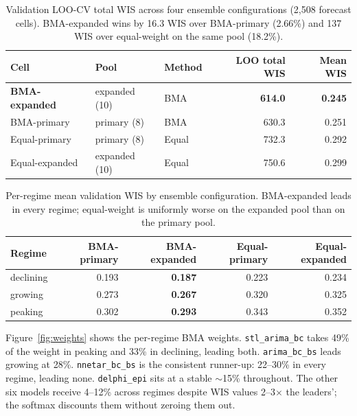 \documentclass[11pt]{article}
\begin{document}
\begin{table}[h]
\centering
\caption{Validation LOO-CV total WIS across four ensemble configurations
(2,508 forecast cells). BMA-expanded wins by 16.3 WIS over BMA-primary
(2.66\%) and 137 WIS over equal-weight on the same pool (18.2\%).}
\label{tab:matrix}
\small
\begin{tabular}{lllrr}
\toprule
\textbf{Cell} & \textbf{Pool} & \textbf{Method} & \textbf{LOO total WIS} & \textbf{Mean WIS} \\
\midrule
\textbf{BMA-expanded}    & expanded (10) & BMA   & \textbf{614.0} & \textbf{0.245} \\
BMA-primary              & primary (8)   & BMA   & 630.3          & 0.251 \\
Equal-primary            & primary (8)   & Equal & 732.3          & 0.292 \\
Equal-expanded           & expanded (10) & Equal & 750.6          & 0.299 \\
\bottomrule
\end{tabular}
\end{table}

\begin{table}[h]
\centering
\caption{Per-regime mean validation WIS by ensemble configuration.
BMA-expanded leads in every regime; equal-weight is uniformly worse on
the expanded pool than on the primary pool.}
\label{tab:regime}
\small
\begin{tabular}{lrrrr}
\toprule
\textbf{Regime} & \textbf{BMA-primary} & \textbf{BMA-expanded} & \textbf{Equal-primary} & \textbf{Equal-expanded} \\
\midrule
declining & 0.193 & \textbf{0.187} & 0.223 & 0.234 \\
growing   & 0.273 & \textbf{0.267} & 0.320 & 0.325 \\
peaking   & 0.302 & \textbf{0.293} & 0.343 & 0.352 \\
\bottomrule
\end{tabular}
\end{table}

Figure~\ref{fig:weights} shows the per-regime BMA weights.
\texttt{stl\_arima\_bc} takes 49\% of the weight in peaking and
33\% in declining, leading both. \texttt{arima\_bc\_bs} leads
growing at 28\%. \texttt{nnetar\_bc\_bs} is the consistent
runner-up: 22--30\% in every regime, leading none.
\texttt{delphi\_epi} sits at a stable $\sim$15\% throughout.
The other six models receive 4--12\% across regimes despite WIS
values 2--3$\times$ the leaders'; the softmax discounts them
without zeroing them out.
\end{document}
